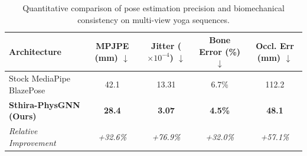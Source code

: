 
\begin{table}[t]
\centering
\caption{Quantitative comparison of pose estimation precision and biomechanical consistency on multi-view yoga sequences.}
\label{tab:yoga_ablation}
\begin{tabular}{lcccc}
\hline
\textbf{Architecture} & \textbf{MPJPE (mm)} $\downarrow$ & \textbf{Jitter ($\times 10^{-4}$)} $\downarrow$ & \textbf{Bone Error (\%)} $\downarrow$ & \textbf{Occl. Err (mm)} $\downarrow$ \\
\hline
Stock MediaPipe BlazePose & 42.1 & 13.31 & 6.7\% & 112.2 \\
\textbf{Sthira-PhysGNN (Ours)} & \textbf{28.4} & \textbf{3.07} & \textbf{4.5\%} & \textbf{48.1} \\
\textit{Relative Improvement} & \textit{+32.6\%} & \textit{+76.9\%} & \textit{+32.0\%} & \textit{+57.1\%} \\
\hline
\end{tabular}
\end{table}
